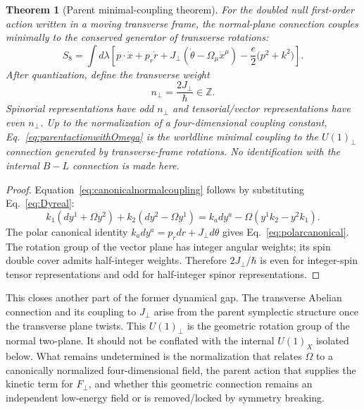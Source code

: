 \documentclass[11pt]{article}
\newtheorem{theorem}{Theorem}[section]
\theoremstyle{definition}\newtheorem{definition}[theorem]{Definition}
\theoremstyle{remark}\newtheorem{remark}[theorem]{Remark}\newtheorem{conjecture}[theorem]{Conjecture}
\begin{document}
\begin{theorem}[Parent minimal-coupling theorem]\label{thm:parentminimalcoupling}
For the doubled null first-order action written in a moving transverse frame, the normal-plane connection couples minimally to the conserved generator of transverse rotations:
\begin{equation}\label{eq:parentactionwithOmega}
 S_8=\int d\lambda\left[
 p\cdot\dot x+p_r\dot r
 +J_\perp(\dot\theta-\Omega_\mu\dot x^\mu)
 -\frac e2\bigl(p^2+k^2\bigr)
 \right].
\end{equation}
After quantization, define the transverse weight
\begin{equation}\label{eq:XfromJ}
 \boxed{n_\perp=\frac{2J_\perp}{\hbar}\in\mathbb Z.}
\end{equation}
Spinorial representations have odd $n_\perp$ and tensorial/vector representations have even $n_\perp$. Up to the normalization of a four-dimensional coupling constant, Eq.~\eqref{eq:parentactionwithOmega} is the worldline minimal coupling to the $U(1)_\perp$ connection generated by transverse-frame rotations. No identification with the internal $B-L$ connection is made here.
\end{theorem}
\begin{proof}
Equation~\eqref{eq:canonicalnormalcoupling} follows by substituting Eq.~\eqref{eq:Dyreal}:
\begin{equation}
 k_1(dy^1+\Omega y^2)+k_2(dy^2-\Omega y^1)
 =k_a dy^a-\Omega(y^1k_2-y^2k_1).
\end{equation}
The polar canonical identity $k_a dy^a=p_rdr+J_\perp d\theta$ gives Eq.~\eqref{eq:polarcanonical}. The rotation group of the vector plane has integer angular weights; its spin double cover admits half-integer weights. Therefore $2J_\perp/\hbar$ is even for integer-spin tensor representations and odd for half-integer spinor representations.
\end{proof}

This closes another part of the former dynamical gap. The transverse Abelian connection and its coupling to $J_\perp$ arise from the parent symplectic structure once the transverse plane twists. This $U(1)_\perp$ is the geometric rotation group of the normal two-plane. It should not be conflated with the internal $U(1)_X$ isolated below. What remains undetermined is the normalization that relates $\Omega$ to a canonically normalized four-dimensional field, the parent action that supplies the kinetic term for $F_\perp$, and whether this geometric connection remains an independent low-energy field or is removed/locked by symmetry breaking.
\end{document}
